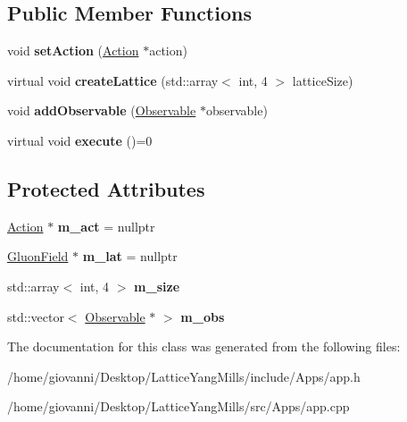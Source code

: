 \subsection*{Public Member Functions}
\begin{DoxyCompactItemize}
\item 
void {\bfseries set\+Action} (\hyperlink{classAction}{Action} $\ast$action)\hypertarget{classApp_a521478e111127d2166d2e897b9900eb5}{}\label{classApp_a521478e111127d2166d2e897b9900eb5}

\item 
virtual void {\bfseries create\+Lattice} (std\+::array$<$ int, 4 $>$ lattice\+Size)\hypertarget{classApp_a8f35d6814a0306dd31c7c583f6c8d92c}{}\label{classApp_a8f35d6814a0306dd31c7c583f6c8d92c}

\item 
void {\bfseries add\+Observable} (\hyperlink{classObservable}{Observable} $\ast$observable)\hypertarget{classApp_a4796925a8a54cfe4456419b94160746e}{}\label{classApp_a4796925a8a54cfe4456419b94160746e}

\item 
virtual void {\bfseries execute} ()=0\hypertarget{classApp_a060dd95f437842171d448ac822dfa983}{}\label{classApp_a060dd95f437842171d448ac822dfa983}

\end{DoxyCompactItemize}
\subsection*{Protected Attributes}
\begin{DoxyCompactItemize}
\item 
\hyperlink{classAction}{Action} $\ast$ {\bfseries m\+\_\+act} = nullptr\hypertarget{classApp_a891ae68e54bb04fcf74579c62a8d5860}{}\label{classApp_a891ae68e54bb04fcf74579c62a8d5860}

\item 
\hyperlink{classField}{Gluon\+Field} $\ast$ {\bfseries m\+\_\+lat} = nullptr\hypertarget{classApp_a58776f77facca2185bf53974b05a7280}{}\label{classApp_a58776f77facca2185bf53974b05a7280}

\item 
std\+::array$<$ int, 4 $>$ {\bfseries m\+\_\+size}\hypertarget{classApp_a8ca118f6637bfd14129ba61f985876d7}{}\label{classApp_a8ca118f6637bfd14129ba61f985876d7}

\item 
std\+::vector$<$ \hyperlink{classObservable}{Observable} $\ast$ $>$ {\bfseries m\+\_\+obs}\hypertarget{classApp_af2803baf8aaf959201b28fb16a46a3d4}{}\label{classApp_af2803baf8aaf959201b28fb16a46a3d4}

\end{DoxyCompactItemize}


The documentation for this class was generated from the following files\+:\begin{DoxyCompactItemize}
\item 
/home/giovanni/\+Desktop/\+Lattice\+Yang\+Mills/include/\+Apps/app.\+h\item 
/home/giovanni/\+Desktop/\+Lattice\+Yang\+Mills/src/\+Apps/app.\+cpp\end{DoxyCompactItemize}

